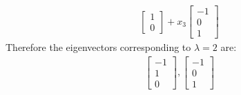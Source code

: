 \documentclass[10pt,letterpaper,final]{report}
\begin{document}
\begin{enumerate}[label=(\alph*)]
\begin{align*}
\begin{bmatrix}
                                                           1  \\
                                                           0
                                                         \end{bmatrix} + x_3\begin{bmatrix}
                                                                              -1 \\
                                                                              0  \\
                                                                              1
                                                                            \end{bmatrix}
        \end{align*}
        Therefore the eigenvectors corresponding to $\lambda = 2$ are:
        \begin{align*}
          \begin{bmatrix}
            -1 \\
            1  \\
            0
          \end{bmatrix}, \begin{bmatrix}
                           -1 \\
                           0  \\
                           1
                         \end{bmatrix}
        \end{align*}


\end{enumerate}
\end{document}
